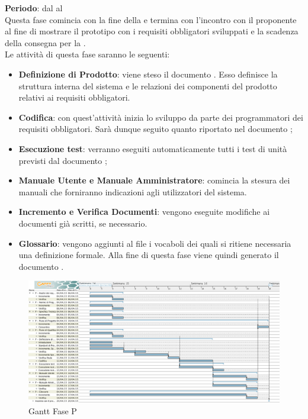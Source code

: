 	\textbf{Periodo}: dal  al  \\Questa fase comincia con la fine della  e termina con l'incontro con il proponente al fine di mostrare il prototipo con i requisiti obbligatori sviluppati e la scadenza della consegna per la .\\Le attività di questa fase saranno le seguenti:
	\begin{itemize}
		\item\textbf{Definizione di Prodotto}: viene steso il documento . Esso definisce la struttura interna del sistema e le relazioni dei componenti del prodotto relativi ai requisiti obbligatori.
		\item \textbf{Codifica}: con quest'attività inizia lo sviluppo da parte dei programmatori dei requisiti obbligatori. Sarà dunque seguito quanto riportato nel documento ;
		\item \textbf{Esecuzione test}: verranno eseguiti automaticamente tutti i test di unità previsti dal documento ;
		\item\textbf{Manuale Utente e Manuale Amministratore}: comincia la stesura dei manuali che forniranno indicazioni agli utilizzatori del sistema.
		\item\textbf{Incremento e Verifica Documenti}: vengono eseguite modifiche ai documenti già scritti, se necessario.
		\item\textbf{Glossario}: vengono aggiunti al file  i vocaboli dei quali si ritiene necessaria una definizione formale. Alla fine di questa fase viene quindi generato il documento .
	\end{itemize}
	\begin{figure}[H]\centering
		\includegraphics[width=\textwidth]{PianoDiProgetto/Pics/FaseP.png}
	\caption{Gantt Fase P}
\end{figure}